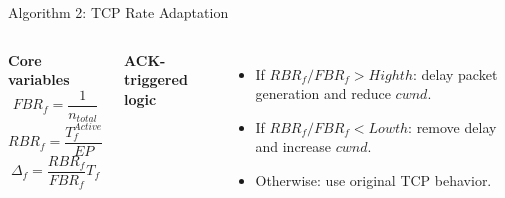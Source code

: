 \begin{frame}{Algorithm 2: TCP Rate Adaptation}

\begin{columns}[T,onlytextwidth]
\textbf{Core variables}
\[
FBR_f=\frac{1}{n_{total}}
\]
\[
RBR_f=\frac{T_f^{Active}}{EP}
\]
\[
\Delta_f=\frac{RBR_f}{FBR_f}T_f
\]

\textbf{ACK-triggered logic}
\begin{itemize}
    \item If $RBR_f/FBR_f > Highth$: delay packet generation and reduce $cwnd$.
    \item If $RBR_f/FBR_f < Lowth$: remove delay and increase $cwnd$.
    \item Otherwise: use original TCP behavior.
\end{itemize}

\vspace{0.2cm}
\end{columns}
\end{frame}
